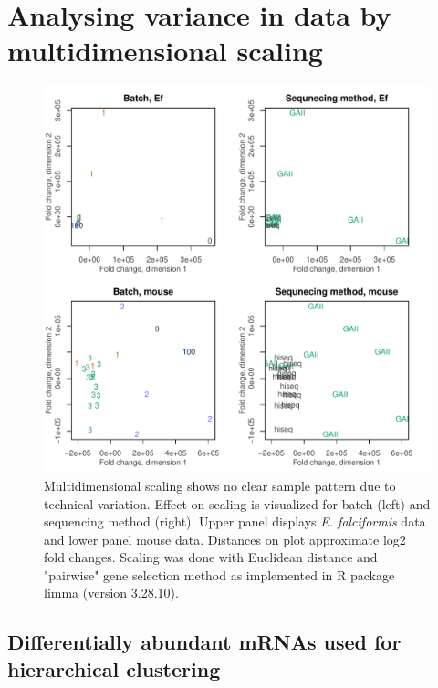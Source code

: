 \documentclass{article}
\begin{document}
\section{Analysing variance in data by multidimensional scaling}
\begin{figure}[H]
\begin{center}
	\includegraphics[width=\textwidth]{EfMm_4-mds.pdf} %
	\caption{Multidimensional scaling shows no clear sample pattern due to technical variation. Effect on scaling is visualized for batch (left) and sequencing method (right). Upper panel displays \textit{E. falciformis} data and lower panel mouse data. Distances on plot approximate log2 fold changes. Scaling was done with Euclidean distance and "pairwise" gene selection method as implemented in R package limma (version 3.28.10).}
\end{center}
\end{figure}


\subsection{Differentially abundant mRNAs used for hierarchical clustering}
\end{document}

